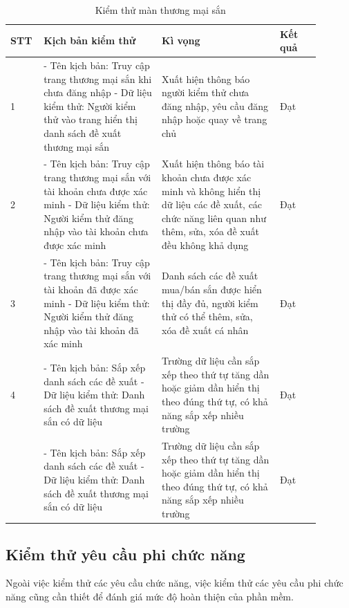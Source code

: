 \documentclass[./../main.tex]{subfiles}
\begin{document}
\begin{longtable}{| p{0.07\linewidth} | p{0.35\linewidth} | p{0.35\linewidth} | p{0.12\linewidth} |}
\caption{Kiểm thử màn thương mại sắn} \label{test-case-3}
\hline
\textbf{STT} & \textbf{Kịch bản kiểm thử} & \textbf{Kì vọng} & \textbf{Kết quả}
\\ \hline 
    \centerline{1} & 
    - Tên kịch bản: Truy cập trang thương mại sắn khi chưa đăng nhập \newline
    - Dữ liệu kiểm thử: Người kiểm thử vào trang hiển thị danh sách đề xuất thương mại sắn &
    Xuất hiện thông báo người kiểm thử chưa đăng nhập, yêu cầu đăng nhập hoặc quay về trang chủ &
    \centerline{Đạt}
\\ \hline
     \centerline{2} & 
    - Tên kịch bản: Truy cập trang thương mại sắn với tài khoản chưa được xác minh \newline 
    - Dữ liệu kiểm thử: Người kiểm thử đăng nhập vào tài khoản chưa được xác minh &
    Xuất hiện thông báo tài khoản chưa được xác minh và không hiển thị dữ liệu các đề xuất, các chức năng liên quan như thêm, sửa, xóa đề xuất đều không khả dụng &
    \centerline{Đạt}
\\ \hline 
    \centerline{3} & 
    - Tên kịch bản: Truy cập trang thương mại sắn với tài khoản đã được xác minh \newline
    - Dữ liệu kiểm thử: Người kiểm thử đăng nhập vào tài khoản đã xác minh &
    Danh sách các đề xuất mua/bán sắn được hiển thị đầy đủ, người kiểm thử có thể thêm, sửa, xóa đề xuất cá nhân &
    \centerline{Đạt}
\\ \hline
    \centerline{4} & 
    - Tên kịch bản: Sắp xếp danh sách các đề xuất \newline
    - Dữ liệu kiểm thử: Danh sách đề xuất thương mại sắn có dữ liệu &
    Trường dữ liệu cần sắp xếp theo thứ tự tăng dần hoặc giảm dần hiển thị theo đúng thứ tự, có khả năng sắp xếp nhiều trường &
    \centerline{Đạt}
\\ \hline
    \centerline{} & 
    - Tên kịch bản: Sắp xếp danh sách các đề xuất \newline
    - Dữ liệu kiểm thử: Danh sách đề xuất thương mại sắn có dữ liệu &
    Trường dữ liệu cần sắp xếp theo thứ tự tăng dần hoặc giảm dần hiển thị theo đúng thứ tự, có khả năng sắp xếp nhiều trường &
    \centerline{Đạt}
\\ \hline
\end{longtable}

\subsection{Kiểm thử yêu cầu phi chức năng}
Ngoài việc kiểm thử các yêu cầu chức năng, việc kiểm thử các yêu cầu phi chức năng cũng cần thiết để đánh giá mức độ hoàn thiện của phần mềm.
\end{document}
